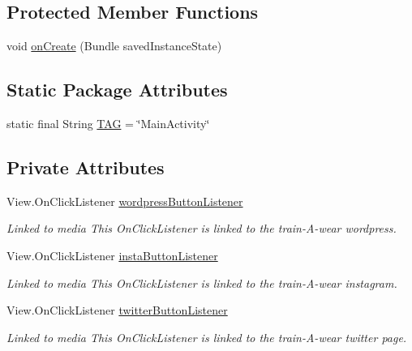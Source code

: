 \subsection*{Protected Member Functions}
\begin{DoxyCompactItemize}
\item 
void \mbox{\hyperlink{classcom_1_1example_1_1trainawearapplication_1_1_main_activity_ab22dede000985c356ec6d4419f3d2825}{on\+Create}} (Bundle saved\+Instance\+State)
\end{DoxyCompactItemize}
\subsection*{Static Package Attributes}
\begin{DoxyCompactItemize}
\item 
static final String \mbox{\hyperlink{classcom_1_1example_1_1trainawearapplication_1_1_main_activity_a03992dd3287317fb72593c3bea10f322}{T\+AG}} = \char`\"{}Main\+Activity\char`\"{}
\end{DoxyCompactItemize}
\subsection*{Private Attributes}
\begin{DoxyCompactItemize}
\item 
View.\+On\+Click\+Listener \mbox{\hyperlink{classcom_1_1example_1_1trainawearapplication_1_1_main_activity_a24be9aa01bd26567f9846c8007a979bd}{wordpress\+Button\+Listener}}
\begin{DoxyCompactList}\small\item\em Linked to media This On\+Click\+Listener is linked to the train-\/\+A-\/wear wordpress. \end{DoxyCompactList}\item 
View.\+On\+Click\+Listener \mbox{\hyperlink{classcom_1_1example_1_1trainawearapplication_1_1_main_activity_a46b1c1063fc63c8850150682ceef4d5b}{insta\+Button\+Listener}}
\begin{DoxyCompactList}\small\item\em Linked to media This On\+Click\+Listener is linked to the train-\/\+A-\/wear instagram. \end{DoxyCompactList}\item 
View.\+On\+Click\+Listener \mbox{\hyperlink{classcom_1_1example_1_1trainawearapplication_1_1_main_activity_adcd1acce2d6a6b0b3d3c880d961e9e01}{twitter\+Button\+Listener}}
\begin{DoxyCompactList}\small\item\em Linked to media This On\+Click\+Listener is linked to the train-\/\+A-\/wear twitter page. \end{DoxyCompactList}\end{DoxyCompactItemize}


